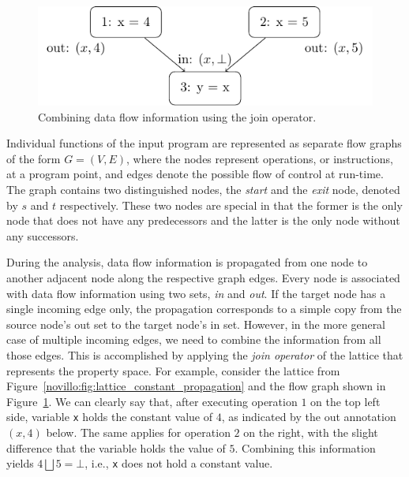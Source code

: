 \begin{figure}[b]
  \begin{center}
    \includegraphics{contr_flow_graph}
  \end{center}
  \vspace{-1em}
  \caption{Combining data flow information using the join operator.}
  \label{novillo:fig:control_flow_graph}
\end{figure}

Individual functions of the input program are represented as separate flow
graphs of the form $G = (V,E)$, where the nodes represent operations, or
instructions, at a program point, and edges denote the possible flow of control
at run-time. The graph contains two distinguished nodes, the \emph{start} and
the \emph{exit} node, denoted by $s$ and $t$ respectively. These two nodes are
special in that the former is the only node that does not have any predecessors
and the latter is the only node without any successors.

During the analysis, data flow information is propagated from one node to
another adjacent node along the respective graph edges. Every node is associated
with data flow information using two sets, \emph{in} and \emph{out}. If the
target node has a single incoming edge only, the propagation corresponds to a
simple copy from the source node's out set to the target node's in set. However,
in the more general case of multiple incoming edges, we need to combine the
information from all those edges. This is accomplished by applying the
\emph{join operator} of the lattice that represents the property space. For
example, consider the lattice from
Figure~\ref{novillo:fig:lattice_constant_propagation} and the flow graph shown
in Figure~\ref{novillo:fig:control_flow_graph}. We can clearly say that, after
executing operation $1$ on the top left side, variable \texttt{x} holds the
constant value of $4$, as indicated by the out annotation $(x, 4)$ below. The
same applies for operation $2$ on the right, with the slight difference that the
variable holds the value of $5$. Combining this information yields $4 \bigsqcup
5 = \bot$, i.e., \texttt{x} does not hold a constant value.

